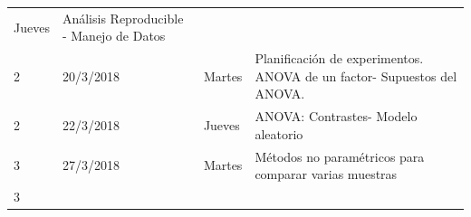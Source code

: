 \documentclass[]{book}
\theoremstyle{definition}
\theoremstyle{definition}
\theoremstyle{definition}
\theoremstyle{remark}
\begin{document}
\begin{longtable}[]{@{}llll@{}}
\begin{minipage}[t]{0.05\columnwidth}
Jueves\strut
\end{minipage} & \begin{minipage}[t]{0.71\columnwidth}\raggedright
Análisis Reproducible - Manejo de Datos\strut
\end{minipage}\tabularnewline
\begin{minipage}[t]{0.05\columnwidth}\raggedright
2\strut
\end{minipage} & \begin{minipage}[t]{0.07\columnwidth}\raggedright
20/3/2018\strut
\end{minipage} & \begin{minipage}[t]{0.05\columnwidth}\raggedright
Martes\strut
\end{minipage} & \begin{minipage}[t]{0.71\columnwidth}\raggedright
Planificación de experimentos. ANOVA de un factor- Supuestos del
ANOVA.\strut
\end{minipage}\tabularnewline
\begin{minipage}[t]{0.05\columnwidth}\raggedright
2\strut
\end{minipage} & \begin{minipage}[t]{0.07\columnwidth}\raggedright
22/3/2018\strut
\end{minipage} & \begin{minipage}[t]{0.05\columnwidth}\raggedright
Jueves\strut
\end{minipage} & \begin{minipage}[t]{0.71\columnwidth}\raggedright
ANOVA: Contrastes- Modelo aleatorio\strut
\end{minipage}\tabularnewline
\begin{minipage}[t]{0.05\columnwidth}\raggedright
3\strut
\end{minipage} & \begin{minipage}[t]{0.07\columnwidth}\raggedright
27/3/2018\strut
\end{minipage} & \begin{minipage}[t]{0.05\columnwidth}\raggedright
Martes\strut
\end{minipage} & \begin{minipage}[t]{0.71\columnwidth}\raggedright
Métodos no paramétricos para comparar varias muestras\strut
\end{minipage}\tabularnewline
\begin{minipage}[t]{0.05\columnwidth}\raggedright
3\strut
\end{minipage} & \begin{minipage}[t]{0.07\columnwidth}\raggedright

\end{minipage}
\end{longtable}
\end{document}

